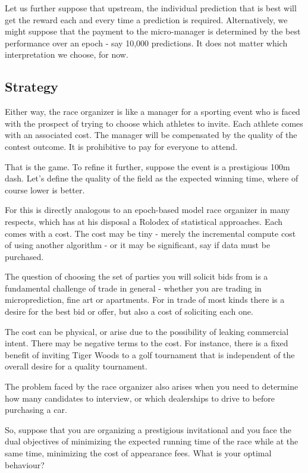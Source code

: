 Let us further suppose that upstream, the individual prediction that is best will get the reward each and every time a prediction is required. Alternatively, we might suppose that the payment to the micro-manager is determined by the best performance over an epoch - say 10,000 predictions. It does not matter which interpretation we choose, for now. 

\subsection{Strategy}

Either way, the race organizer is like a manager for a sporting event who is faced with the prospect of trying to choose which athletes to invite. Each athlete comes with an associated cost. The manager will be compensated by the quality of the contest outcome. It is prohibitive to pay for everyone to attend. 

That is the game. To refine it further, suppose the event is a prestigious 100m dash. Let's define the quality of the field as the expected winning time, where of course lower is better. 

For this is directly analogous to an epoch-based model race organizer in many respects, which has at his disposal a Rolodex of statistical approaches. Each comes with a cost. The cost may be tiny - merely the incremental compute cost of using another algorithm - or it may be significant, say if data must be purchased. 


The question of choosing the set of parties you will solicit bids from is a fundamental challenge of trade in general - whether you are trading in microprediction, fine art or apartments. For in trade of most kinds there is a desire for the best bid or offer, but also a cost of soliciting each one. 

The cost can be physical, or arise due to the possibility of leaking commercial intent. There may be negative terms to the cost. For instance, there is a fixed benefit of inviting Tiger Woods to a golf tournament that is independent of the overall desire for a quality tournament.  


The problem faced by the race organizer also arises when you need to determine how many candidates to interview, or which dealerships to drive to before purchasing a car. 

So, suppose that you are organizing a prestigious invitational and you face the dual objectives of minimizing the expected running time of the race while at the same time, minimizing the cost of appearance fees. What is your optimal behaviour? 


